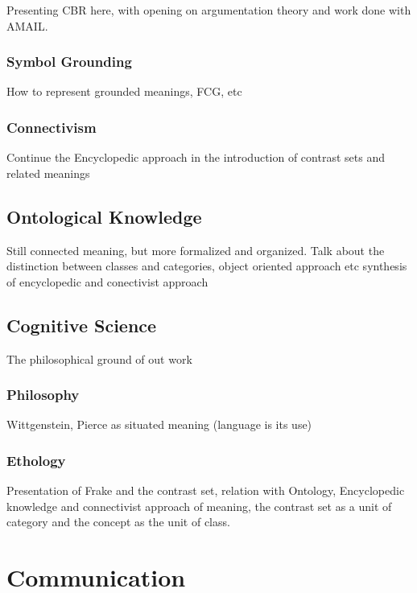 Presenting CBR here, with opening on argumentation theory and work done with AMAIL.

\subsubsection{Symbol Grounding}

How to represent grounded meanings, FCG, etc

\subsubsection{Connectivism}

Continue the Encyclopedic approach in the introduction of contrast sets and related meanings

\subsection{Ontological Knowledge}

Still connected meaning, but more formalized and organized. Talk about the distinction between classes and categories, object oriented approach etc synthesis of encyclopedic and conectivist approach

\subsection{Cognitive Science}

The philosophical ground of out work

\subsubsection{Philosophy}

Wittgenstein, Pierce as situated meaning (language is its use)

\subsubsection{Ethology}

Presentation of Frake and the contrast set, relation with Ontology, Encyclopedic knowledge and connectivist approach of meaning, the contrast set as a unit of category and the concept as the unit of class.

\section{Communication}


